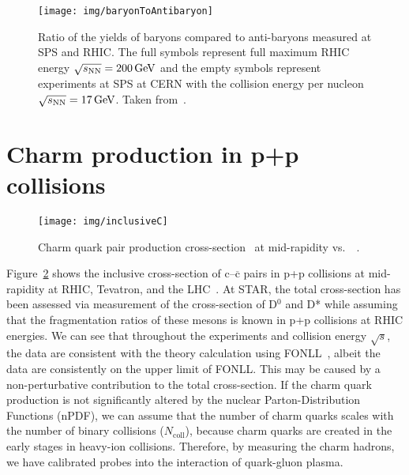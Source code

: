 \begin{figure}
\centering
\texttt{[image: img/baryonToAntibaryon]}
\caption[Ratio of the yields of baryons compared to anti-baryons measured at SPS and~RHIC\@.]{Ratio of the yields of baryons compared to anti-baryons measured at SPS and RHIC\@. The full symbols represent full maximum RHIC energy $\sqrt{s_\text{NN}} = \SI{200}{GeV}$ and the empty symbols represent experiments at SPS at CERN with the collision energy per nucleon $\sqrt{s_\text{NN}} = \SI{17}{GeV}$. Taken from~\cite{BtoAntiB}.}
\label{fig:BtoAntiB}
\end{figure}

\section{Charm production in p+p collisions}

\begin{figure}[!htb]
\centering
\texttt{[image: img/inclusiveC]}
\caption[Charm quark pair production cross-section at mid-rapidity vs.\ \pt.]{Charm quark pair production cross-section~\cite{pp500GeVcharm} at mid-rapidity vs.\ \pt~\cite{FONLLcharm,GuannanQM15,ALICEcharm,CDFcharm,pp200GeVcharm}.}
\label{fig:inclusiveC}
\end{figure}

Figure~\ref{fig:inclusiveC} shows the inclusive cross-section of c--$\overline{\mathrm{c}}$ pairs in p+p collisions at mid-rapidity at RHIC, Tevatron, and the LHC~\cite{GuannanQM15,ALICEcharm,CDFcharm,pp200GeVcharm,pp500GeVcharm}\@. At STAR, the total cross-section has been assessed via measurement of the cross-section of D$^0$ and D* while assuming that the fragmentation ratios of these mesons is known in p+p collisions at RHIC energies. We can see that throughout the experiments and collision energy $\sqrt{s}$, the data are consistent with the theory calculation using FONLL~\cite{FONLLcharm}, albeit the data are consistently on the upper limit of FONLL\@. This may be caused by a non-perturbative contribution to the total cross-section. If the charm quark production is not significantly altered by the nuclear Parton-Distribution Functions (nPDF), we can assume that the number of charm quarks scales with the number of binary collisions ($N_\mathrm{coll}$), because charm quarks are created in the early stages in heavy-ion collisions. Therefore, by measuring the charm hadrons, we have calibrated probes into the interaction of quark-gluon plasma.

